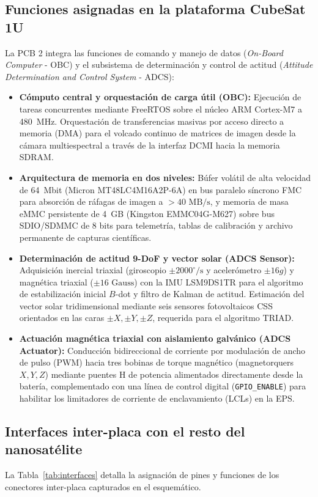 \documentclass[11pt,a4paper]{article}
\begin{document}
\subsection{Funciones asignadas en la plataforma CubeSat 1U}
La PCB 2 integra las funciones de comando y manejo de datos (\emph{On-Board Computer} - OBC) y el subsistema de determinación y control de actitud (\emph{Attitude Determination and Control System} - ADCS):
\begin{itemize}
    \item \textbf{Cómputo central y orquestación de carga útil (OBC):} Ejecución de tareas concurrentes mediante FreeRTOS sobre el núcleo ARM Cortex-M7 a 480~MHz. Orquestación de transferencias masivas por acceso directo a memoria (DMA) para el volcado continuo de matrices de imagen desde la cámara multiespectral a través de la interfaz DCMI hacia la memoria SDRAM.
    \item \textbf{Arquitectura de memoria en dos niveles:} Búfer volátil de alta velocidad de 64~Mbit (Micron MT48LC4M16A2P-6A) en bus paralelo síncrono FMC para absorción de ráfagas de imagen a $>40\text{ MB/s}$, y memoria de masa eMMC persistente de 4~GB (Kingston EMMC04G-M627) sobre bus SDIO/SDMMC de 8 bits para telemetría, tablas de calibración y archivo permanente de capturas científicas.
    \item \textbf{Determinación de actitud 9-DoF y vector solar (ADCS Sensor):} Adquisición inercial triaxial (giroscopio $\pm 2000^\circ/\text{s}$ y acelerómetro $\pm 16g$) y magnética triaxial ($\pm 16\text{ Gauss}$) con la IMU LSM9DS1TR para el algoritmo de estabilización inicial $B$-dot y filtro de Kalman de actitud. Estimación del vector solar tridimensional mediante seis sensores fotovoltaicos CSS orientados en las caras $\pm X, \pm Y, \pm Z$, requerida para el algoritmo TRIAD.
    \item \textbf{Actuación magnética triaxial con aislamiento galvánico (ADCS Actuator):} Conducción bidireccional de corriente por modulación de ancho de pulso (PWM) hacia tres bobinas de torque magnético (magnetorquers $X, Y, Z$) mediante puentes H de potencia alimentados directamente desde la batería, complementado con una línea de control digital (\texttt{GPIO\_ENABLE}) para habilitar los limitadores de corriente de enclavamiento (LCLs) en la EPS.
\end{itemize}

\subsection{Interfaces inter-placa con el resto del nanosatélite}
La Tabla~\ref{tab:interfaces} detalla la asignación de pines y funciones de los conectores inter-placa capturados en el esquemático.
\end{document}
